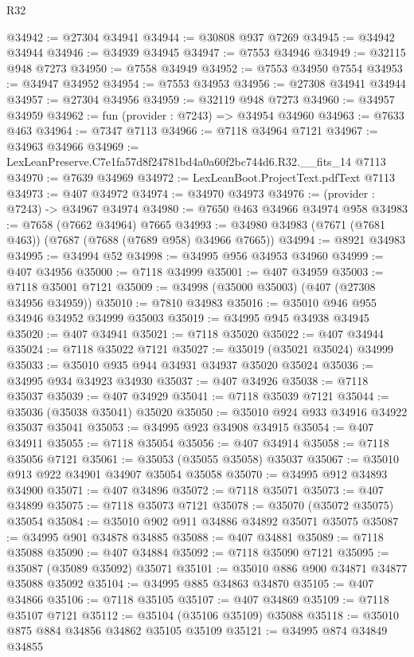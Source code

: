 \begin{lexlean}{R32}
\begin{coremodule}
@34942 := @27304 @34941
@34944 := @30808 @937 @7269
@34945 := @34942 @34944
@34946 := @34939 @34945
@34947 := @7553 @34946
@34949 := @32115 @948 @7273
@34950 := @7558 @34949
@34952 := @7553 @34950 @7554
@34953 := @34947 @34952
@34954 := @7553 @34953
@34956 := @27308 @34941 @34944
@34957 := @27304 @34956
@34959 := @32119 @948 @7273
@34960 := @34957 @34959
@34962 := fun (provider : @7243) => @34954 @34960
@34963 := @7633 @463
@34964 := @7347 @7113
@34966 := @7118 @34964 @7121
@34967 := @34963 @34966
@34969 := LexLeanPreserve.C7e1fa57d8f24781bd4a0a60f2bc744d6.R32.__fits_14 @7113
@34970 := @7639 @34969
@34972 := LexLeanBoot.ProjectText.pdfText @7113
@34973 := @407 @34972
@34974 := @34970 @34973
@34976 := (provider : @7243) -> @34967 @34974
@34980 := @7650 @463 @34966 @34974 @958
@34983 := @7658 (@7662 @34964) @7665
@34993 := @34980 @34983 (@7671 (@7681 @463)) (@7687 (@7688 (@7689 @958) @34966 @7665))
@34994 := @8921 @34983
@34995 := @34994 @52
@34998 := @34995 @956 @34953 @34960
@34999 := @407 @34956
@35000 := @7118 @34999
@35001 := @407 @34959
@35003 := @7118 @35001 @7121
@35009 := @34998 (@35000 @35003) (@407 (@27308 @34956 @34959))
@35010 := @7810 @34983
@35016 := @35010 @946 @955 @34946 @34952 @34999 @35003
@35019 := @34995 @945 @34938 @34945
@35020 := @407 @34941
@35021 := @7118 @35020
@35022 := @407 @34944
@35024 := @7118 @35022 @7121
@35027 := @35019 (@35021 @35024) @34999
@35033 := @35010 @935 @944 @34931 @34937 @35020 @35024
@35036 := @34995 @934 @34923 @34930
@35037 := @407 @34926
@35038 := @7118 @35037
@35039 := @407 @34929
@35041 := @7118 @35039 @7121
@35044 := @35036 (@35038 @35041) @35020
@35050 := @35010 @924 @933 @34916 @34922 @35037 @35041
@35053 := @34995 @923 @34908 @34915
@35054 := @407 @34911
@35055 := @7118 @35054
@35056 := @407 @34914
@35058 := @7118 @35056 @7121
@35061 := @35053 (@35055 @35058) @35037
@35067 := @35010 @913 @922 @34901 @34907 @35054 @35058
@35070 := @34995 @912 @34893 @34900
@35071 := @407 @34896
@35072 := @7118 @35071
@35073 := @407 @34899
@35075 := @7118 @35073 @7121
@35078 := @35070 (@35072 @35075) @35054
@35084 := @35010 @902 @911 @34886 @34892 @35071 @35075
@35087 := @34995 @901 @34878 @34885
@35088 := @407 @34881
@35089 := @7118 @35088
@35090 := @407 @34884
@35092 := @7118 @35090 @7121
@35095 := @35087 (@35089 @35092) @35071
@35101 := @35010 @886 @900 @34871 @34877 @35088 @35092
@35104 := @34995 @885 @34863 @34870
@35105 := @407 @34866
@35106 := @7118 @35105
@35107 := @407 @34869
@35109 := @7118 @35107 @7121
@35112 := @35104 (@35106 @35109) @35088
@35118 := @35010 @875 @884 @34856 @34862 @35105 @35109
@35121 := @34995 @874 @34849 @34855

\end{coremodule}
\end{lexlean}
